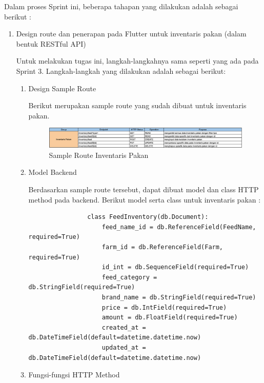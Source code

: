 \begin{spacing}{1.5}
	Dalam proses Sprint ini, beberapa tahapan yang dilakukan adalah sebagai berikut :

	\begin{enumerate}
		\item Design route dan penerapan pada Flutter untuk inventaris pakan (dalam bentuk RESTful API)
		
		Untuk melakukan tugas ini, langkah-langkahnya sama seperti yang ada pada Sprint 3. Langkah-langkah yang dilakukan adalah sebagai berikut:

		\begin{enumerate}
			\item Design Sample Route
			
			Berikut merupakan sample route yang sudah dibuat untuk inventaris pakan.

			\begin{figure}[H]
				\centering
				\includegraphics[width=1\textwidth]{gambar/sprint4/sample_route_pakan.png}
				\caption{Sample Route Inventaris Pakan}
			\end{figure}

			\item Model Backend
 			
			Berdasarkan sample route tersebut, dapat dibuat model dan class HTTP method pada backend. Berikut model serta class untuk inventaris pakan :

			\begin{lstlisting}
				class FeedInventory(db.Document):
					feed_name_id = db.ReferenceField(FeedName, required=True)
					farm_id = db.ReferenceField(Farm, required=True)
					id_int = db.SequenceField(required=True)
					feed_category = db.StringField(required=True)
					brand_name = db.StringField(required=True)
					price = db.IntField(required=True)
					amount = db.FloatField(required=True)
					created_at = db.DateTimeField(default=datetime.datetime.now)
					updated_at = db.DateTimeField(default=datetime.datetime.now)	
			\end{lstlisting}


	
			\item Fungsi-fungsi HTTP Method
			

\end{enumerate}
\end{enumerate}
\end{spacing}
